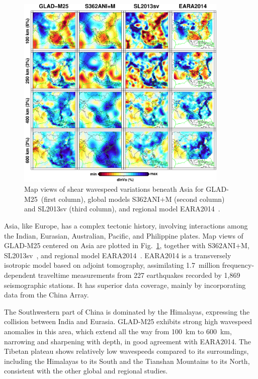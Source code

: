 \documentclass[extra,mreferee]{gji}
\begin{document}
\begin{figure}[ht!]
  \includegraphics[width=0.9\textwidth]{figures/depth_slice/asia_vs.pdf}
  \caption{\small{Map views of shear wavespeed variations beneath Asia for GLAD-M25~(first column),
  global models S362ANI$+$M (second column) and SL2013sv (third column), and regional model EARA2014~\citep[last column;][]{chen2015multiparameter}.}}
  \label{fig:asia-vs}
  \centering
\end{figure}

Asia, like Europe, has a complex tectonic history, involving
interactions among the Indian, Eurasian, Australian, Pacific, and Philippine
plates.
Map views of GLAD-M25 centered on Asia are plotted in Fig.~\ref{fig:asia-vs},
together with S362ANI$+$M, SL2013sv~\citep{SchaefferLebedev13}, and regional model EARA2014~\citep{chen2015multiparameter}.
EARA2014 is a transversely isotropic model based on adjoint
tomography, assimilating 1.7~million frequency-dependent traveltime
measurements from 227 earthquakes recorded by 1,869 seismographic  stations.
It has superior data coverage, mainly by incorporating data from the China Array.

The Southwestern part of China is dominated by the Himalayas,
expressing the collision between India and Eurasia.
GLAD-M25 exhibits strong high wavespeed anomalies in this area,
which extend all the way from 100~km to 600~km, narrowing and sharpening with depth,
in good agreement with EARA2014.
The Tibetan plateau shows relatively low wavespeeds
compared to its surroundings, including the Himalayas to its South and
the Tianshan Mountains to its North, consistent with the other global
and regional studies.
\end{document}
